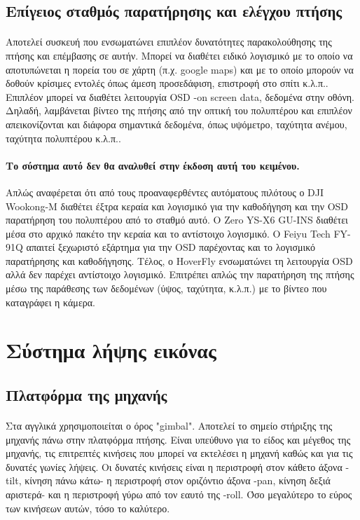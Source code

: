 \documentclass[a4paper, 12pt, twoside]{report}
\begin{document}
{{{{{{		\subsection{Επίγειος σταθμός παρατήρησης και ελέγχου πτήσης}
			\paragraph{}{Αποτελεί συσκευή που ενσωματώνει επιπλέον δυνατότητες παρακολούθησης της πτήσης και επέμβασης σε αυτήν. Μπορεί να διαθέτει ειδικό λογισμικό με το οποίο να αποτυπώνεται η πορεία του σε χάρτη (π.χ. google maps) και με το οποίο μπορούν να δοθούν κρίσιμες εντολές όπως άμεση προσεδάφιση, επιστροφή στο σπίτι κ.λ.π.. Επιπλέον μπορεί να διαθέτει λειτουργία OSD -on screen data, δεδομένα στην οθόνη. Δηλαδή, λαμβάνεται βίντεο της πτήσης από την οπτική του πολυπτέρου και επιπλέον απεικονίζονται και διάφορα σημαντικά δεδομένα, όπως υψόμετρο, ταχύτητα ανέμου, ταχύτητα πολυπτέρου κ.λ.π..
			}
			\paragraph{Το σύστημα αυτό δεν θα αναλυθεί στην έκδοση αυτή του κειμένου.}{Απλώς αναφέρεται ότι από τους προαναφερθέντες αυτόματους πιλότους ο DJI Wookong-M διαθέτει έξτρα κεραία και λογισμικό για την καθοδήγηση και την OSD παρατήρηση του πολυπτέρου από το σταθμό αυτό. Ο Zero YS-X6 GU-INS διαθέτει μέσα στο αρχικό πακέτο την κεραία και το αντίστοιχο λογισμικό. Ο Feiyu Tech FY-91Q απαιτεί ξεχωριστό εξάρτημα για την OSD παρέχοντας και το λογισμικό παρατήρησης και καθοδήγησης. Τέλος, ο HoverFly ενσωματώνει τη λειτουργία OSD αλλά δεν παρέχει αντίστοιχο λογισμικό. Επιτρέπει απλώς την παρατήρηση της πτήσης μέσω της παράθεσης των δεδομένων (ύψος, ταχύτητα, κ.λ.π.) με το βίντεο που καταγράφει η κάμερα.
			}
			
			
		\section{Σύστημα λήψης εικόνας}
		
		\subsection{Πλατφόρμα της μηχανής}
			\paragraph{}{Στα αγγλικά χρησιμοποιείται ο όρος "gimbal". Αποτελεί το σημείο στήριξης της μηχανής πάνω στην πλατφόρμα πτήσης. Είναι υπεύθυνο για το είδος και μέγεθος της μηχανής, τις επιτρεπτές κινήσεις που μπορεί να εκτελέσει η μηχανή καθώς και για τις δυνατές γωνίες λήψεις. Οι δυνατές κινήσεις είναι η περιστροφή στον κάθετο άξονα -tilt, κίνηση πάνω κάτω- η περιστροφή στον οριζόντιο άξονα -pan, κίνηση δεξιά αριστερά- και η περιστροφή γύρω από τον εαυτό της -roll. Όσο μεγαλύτερο το εύρος των κινήσεων αυτών, τόσο το καλύτερο.
			}
			
}}}}}}
\end{document}
